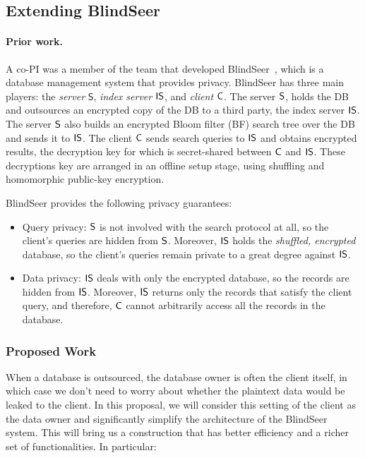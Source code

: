
\subsection{Extending BlindSeer}
\label{sec:ext-blindseer}

\paragraph{Prior work.} A co-PI was a member of the team that developed
BlindSeer~\cite{SP:PKVKMC14,SP:FVKKKM15}, which is a database management system
that provides privacy.
%
BlindSeer has three main players: the \emph{server} $\mathsf{S}$,
{\em index server} $\sf IS$, and {\em client} $\sf C$. The server $\sf S$,
holds the DB and outsources an encrypted copy of the DB to a third party,
the index server $\sf IS$. The server $\sf S$  also builds an
encrypted Bloom filter (BF) search tree over the DB and sends it to $\sf IS$. The
client $\sf C$ sends search queries to $\sf IS$ and obtains encrypted
results, the decryption key for which is secret-shared
between $\sf C$ and $\sf IS$. These decryptions key are arranged in an offline
setup stage, using shuffling and homomorphic public-key
encryption.

BlindSeer provides the following privacy guarantees:
\begin{itemize}\setlength\itemsep{0em}
\item Query privacy: $\sf S$ is not involved with the search protocol at
  all, so the client's queries are hidden from $\sf S$. Moreover, $\sf IS$ holds
    the {\em shuffled, encrypted} database, so the client's queries remain
    private to a great degree against $\sf IS$. 

\item Data privacy: $\sf IS$ deals with only the encrypted database, so the
records are hidden from $\sf IS$. Moreover, $\sf IS$ returns only the records
that satisfy the client query, and therefore, $\sf C$ cannot arbitrarily access
all the records in the database.  
\end{itemize}

\subsubsection{Proposed Work}
When a database is outsourced, the database owner is often the client
itself, in which case we don't need to worry about whether the plaintext data
would be leaked to the client.  In this proposal, we will consider this setting
of the client as the data owner and significantly simplify the architecture of
the BlindSeer system. This will bring us a construction that has better
efficiency and a richer set of functionalities. In particular:

